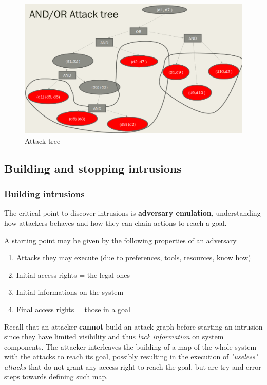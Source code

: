 \begin{figure}[htbp]
   \centering
   \includegraphics{images/attack_tree.png}
   \caption{Attack tree}
   \label{fig:attack_tree}
\end{figure}


\subsection{Building and stopping intrusions}
\subsubsection{Building intrusions}
The critical point to discover intrusions is \textbf{adversary emulation},
understanding how
attackers behaves and how they can chain actions to reach a goal.

A starting point may be given by the following properties of an adversary
\begin{enumerate}
   \item Attacks they may execute (due to preferences, tools, resources, know how)
   \item Initial access rights = the legal ones
   \item Initial informations on the system
   \item Final access rights = those in a goal
\end{enumerate}

Recall that an attacker \textbf{cannot} build an attack graph before starting an intrusion
since they have limited
visibility and thus \textit{lack information} on system components.
The attacker interleaves the building of a map of the whole
system with the attacks to reach its goal,
possibly resulting in the execution of \textit{"useless" attacks} that
do not grant any access right to reach the goal,
but are try-and-error steps towards defining such map.

